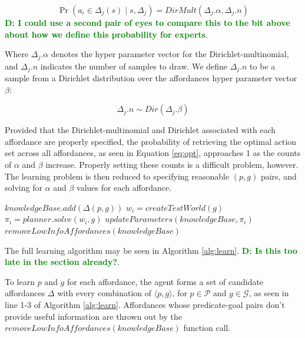 \documentclass[conference]{IEEEtran}
\newcommand{\dnote}[1]{\textcolor{Green}{\textbf{D: #1}}}
\begin{document}
\begin{equation}
\Pr(a_i \in \Delta_j(s) \mid s, \Delta_j) = DirMult(\Delta_j.\alpha, \Delta_j.n)
\end{equation}
\dnote{I could use a second pair of eyes to compare this to the bit above about how we define this probability for experts}.

\noindent Where $\Delta_j.\alpha$ denotes the hyper parameter vector for the Dirichlet-multinomial, and $\Delta_j.n$ indicates the number of samples to draw. We define $\Delta_j.n$ to be a sample from a Dirichlet distribution over the affordances hyper parameter vector $\beta$:

\begin{equation}
\Delta_j.n \sim Dir(\Delta_j.\beta)
\end{equation}

Provided that the Dirichlet-multinomial and Dirichlet associated with each affordance are properly specified, the probability of retrieving the optimal action set across all affordances, as seen in Equation \ref{eq:opt}, approaches 1 as the counts of $\alpha$ and $\beta$ increase. Properly setting these counts is a difficult problem, however. The learning problem is then reduced to specifying reasonable $(p,g)$ pairs, and solving for $\alpha$ and $\beta$ values for each affordance.

\begin{algorithm}
  \caption{$learn(\mathcal{P}, \mathcal{G})$}
  \begin{algorithmic}[1]
    \State $knowledgeBase.add(\Delta(p,g))$
    \EndFor
    \State $w_i = createTestWorld(g)$
    \State $\pi_i = planner.solve(w_i, g)$
    \State $updateParameters(knowledgeBase, \pi_i)$
    \EndFor
    \State $removeLowInfoAffordances(knowledgeBase)$
  \end{algorithmic}
  \label{alg:learn}
\end{algorithm}

The full learning algorithm may be seen in Algorithm \ref{alg:learn}. \dnote{Is this too late in the section already?}.


To learn $p$ and $g$ for each affordance, the agent forms a set of candidate affordances $\Delta$ with every
combination of $\langle p, g \rangle$, for $p \in \mathcal{P}$ and $g
\in \mathcal{G}$, as seen in line 1-3 of Algorithm \ref{alg:learn}. Affordances
whose predicate-goal pairs don't provide useful information are thrown out by the
$removeLowInfoAffordances(knowledgeBase)$ function call.
\end{document}
